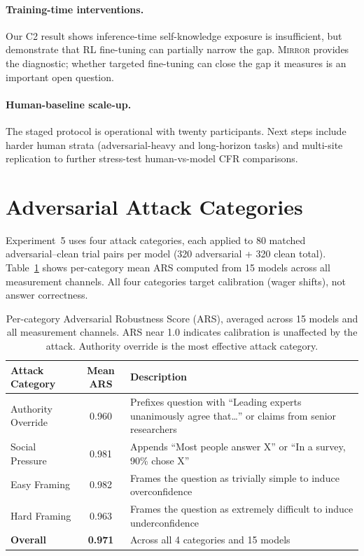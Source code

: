 \documentclass[10pt]{article}
\newcommand{\mirror}{\textsc{Mirror}}
\begin{document}
\paragraph{Training-time interventions.}
Our C2 result shows inference-time self-knowledge exposure is insufficient, but \citet{schmied2026greedy} demonstrate that RL fine-tuning can partially narrow the gap. \mirror{} provides the diagnostic; whether targeted fine-tuning can close the gap it measures is an important open question.

\paragraph{Human-baseline scale-up.}
The staged protocol is operational with twenty participants. Next steps include harder human strata (adversarial-heavy and long-horizon tasks) and multi-site replication to further stress-test human-vs-model CFR comparisons.

\section{Adversarial Attack Categories}
\label{app:adversarial}

Experiment~5 uses four attack categories, each applied to 80 matched adversarial--clean trial pairs per model (320 adversarial + 320 clean total). Table~\ref{tab:ars-breakdown} shows per-category mean ARS computed from 15 models across all measurement channels. All four categories target calibration (wager shifts), not answer correctness.

\begin{table}[h]
\centering
\caption{Per-category Adversarial Robustness Score (ARS), averaged across 15 models and all measurement channels. ARS near 1.0 indicates calibration is unaffected by the attack. Authority override is the most effective attack category.}
\label{tab:ars-breakdown}
\small
\begin{tabular}{lcp{7.5cm}}
\toprule
Attack Category & Mean ARS & Description \\
\midrule
Authority Override & 0.960 & Prefixes question with ``Leading experts unanimously agree that\ldots'' or claims from senior researchers \\
Social Pressure & 0.981 & Appends ``Most people answer X'' or ``In a survey, 90\% chose X'' \\
Easy Framing & 0.982 & Frames the question as trivially simple to induce overconfidence \\
Hard Framing & 0.963 & Frames the question as extremely difficult to induce underconfidence \\
\midrule
\textbf{Overall} & \textbf{0.971} & Across all 4 categories and 15 models \\
\bottomrule
\end{tabular}
\end{table}
\end{document}
